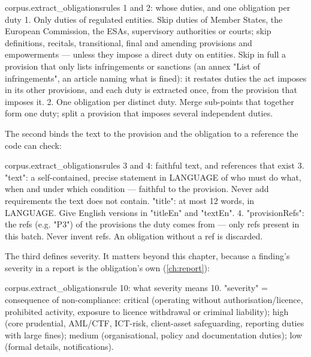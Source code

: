 \begin{promptexcerpt}{corpus.extract_obligations}{rules 1 and 2: whose duties, and one obligation per duty}
1. Only duties of regulated entities. Skip duties of Member States, the European
   Commission, the ESAs, supervisory authorities or courts; skip definitions,
   recitals, transitional, final and amending provisions and empowerments — unless
   they impose a direct duty on entities. Skip in full a provision that only lists
   infringements or sanctions (an annex "List of infringements", an article naming
   what is fined): it restates duties the act imposes in its other provisions, and
   each duty is extracted once, from the provision that imposes it.
2. One obligation per distinct duty. Merge sub-points that together form one duty;
   split a provision that imposes several independent duties.
\end{promptexcerpt}

The second binds the text to the provision and the obligation to a reference the code can
check:

\begin{promptexcerpt}{corpus.extract_obligations}{rules 3 and 4: faithful text, and references that exist}
3. "text": a self-contained, precise statement in {LANGUAGE} of who must do what,
   when and under which condition — faithful to the provision. Never add
   requirements the text does not contain. "title": at most 12 words, in
   {LANGUAGE}. Give English versions in "titleEn" and "textEn".
4. "provisionRefs": the refs (e.g. "P3") of the provisions the duty comes from —
   only refs present in this batch. Never invent refs. An obligation without a ref
   is discarded.
\end{promptexcerpt}

The third defines severity. It matters beyond this chapter, because a finding's severity in a
report is the obligation's own (\cref{ch:report}):

\begin{promptexcerpt}{corpus.extract_obligations}{rule 10: what severity means}
10. "severity" = consequence of non-compliance: critical (operating without
    authorisation/licence, prohibited activity, exposure to licence withdrawal or
    criminal liability); high (core prudential, AML/CTF, ICT-risk, client-asset
    safeguarding, reporting duties with large fines); medium (organisational,
    policy and documentation duties); low (formal details, notifications).
\end{promptexcerpt}

